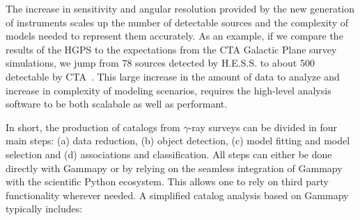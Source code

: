 \documentclass[longauth]{aa}
\newcommand{\gammapy}{Gammapy\xspace}
\newcommand{\hess}{H.E.S.S.\xspace}
\newcommand{\cta}{CTA\xspace}
\newcommand{\gammaray}{$\gamma$-ray\xspace}
\begin{document}
The increase in sensitivity and angular resolution provided by the new generation of
instruments scales up the number of detectable sources and the complexity of 
models needed to represent them accurately. As an example, if we compare the
results of the HGPS to the expectations from the \cta Galactic Plane survey
simulations, we jump from 78 sources detected by \hess to about 500 detectable by
CTA~\citep{Remy2021}. This large increase in the amount of data to analyze
and increase in complexity of modeling scenarios, requires the high-level
analysis software to be both scalabale as well as performant. 

In short, the production of catalogs from \gammaray surveys can be divided in
four main steps: (a) data reduction, (b) object detection, (c) model fitting and model
selection and (d) associations and classification. All steps can either be done directly
with \gammapy or by relying on the seamless integration of \gammapy with the
scientific Python ecosystem. This allows one to rely on third party functionality
wherever needed. A simplified catalog analysis based on \gammapy typically includes:
\end{document}

